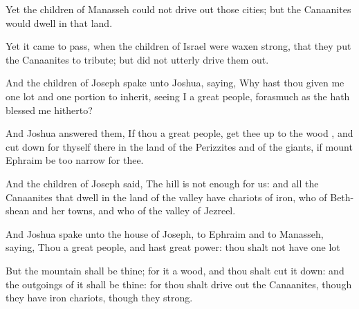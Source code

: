 {Yet the
children of
Manasseh
could not drive
out
{} those
cities; but the
Canaanites
would
dwell in that
land.

Yet it came to pass, when the
children of
Israel were waxen
strong, that they
put the
Canaanites to
tribute; but did not
utterly drive them
out.


\par }{\PP {}And the
children of
Joseph
spake unto
Joshua,
saying, Why hast thou
given me
{}
one
lot and
one
portion to
inherit, seeing I
{} a
great
people, forasmuch
as the
{} hath
blessed me
hitherto?

And
Joshua
answered them, If thou
{} a
great
people,
{} get thee
up to the
wood
{}, and cut
down for thyself there in the
land of the
Perizzites and of the
giants, if
mount
Ephraim be too
narrow for thee.

And the
children of
Joseph
said, The
hill is not
enough for us: and all the
Canaanites that
dwell in the
land of the
valley have
chariots of
iron,
{} who
{} of
Beth-shean and her
towns, and
{} who
{} of the
valley of
Jezreel.

And
Joshua
spake unto the
house of
Joseph,
{} to
Ephraim and to
Manasseh,
saying, Thou
{} a
great
people, and hast
great
power: thou shalt not have
one
lot
{}

But the
mountain shall be thine; for it
{} a
wood, and thou shalt cut it
down: and the
outgoings of it shall be thine: for thou shalt drive
out the
Canaanites, though they have
iron
chariots,
{} though they
{}
strong.




\par }

